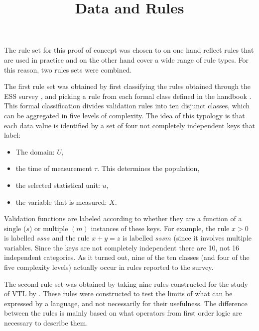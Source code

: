 \title{Data and Rules}
\label{datarules}

The rule set for this proof of concept was chosen to on one hand reflect rules
that are used in practice and on the other hand cover a wide range of rule
types.  For this reason, two rules sets were combined. 

The first rule set was obtained by first classifying the rules obtained through
the ESS survey \citep{walsdorfer:2015}, and picking a rule from each formal
class defined in the handbook \citep{loo:2015c, zio:2015}. This formal
classification divides validation rules into ten disjunct classes,
which can be aggregated in five levels of complexity. 
The idea of this typology is that each data value
is identified by a set of four not completely independent keys that label:
\begin{itemize}
\item The domain: $U$,
\item the time of measurement $\tau$. This determines the population,
\item the selected statistical unit: $u$,
\item the variable that is measured: $X$.
\end{itemize}
Validation functions are labeled according to whether they are a function of a
single ($s$) or multiple $(m)$ instances of these keys. For example, the rule
$x > 0$ is labelled $ssss$ and the rule $x + y = z$ is labelled $sssm$  (since
it involves multiple variables. Since the keys are not completely independent
there are 10, not 16 independent categories.  As it turned out, nine of the ten
classes (and four of the five complexity levels) actually occur in rules
reported to the survey.

The second rule set was obtained by taking nine rules constructed for the study
of VTL by \cite{gelsema:2015}. These rules were constructed to test the limits
of what can be expressed by a language, and not necessarily for their
usefulness. The difference between the rules is mainly based on what operators
from first order logic are necessary to describe them.


